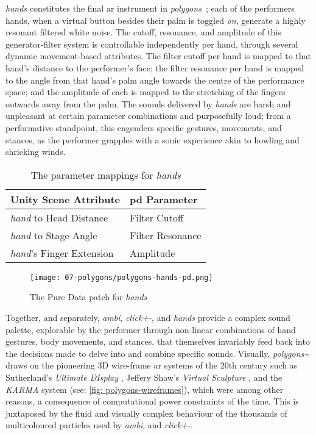 \textit{hands} constitutes the final \gls{ar} instrument in \textit{polygons~}; each of the performers hands, when a virtual button besides their palm is toggled \textit{on}, generate a highly resonant filtered white noise. The cutoff, resonance, and amplitude of this generator-filter system is controllable independently per hand, through several dynamic movement-based attributes. The filter cutoff per hand is mapped to that hand's distance to the performer's face; the filter resonance per hand is mapped to the angle from that hand's palm angle towards the centre of the performance space; and the amplitude of each is mapped to the stretching of the fingers outwards away from the palm. The sounds delivered by \textit{hands} are harsh and unpleasant at certain parameter combinations and purposefully loud; from a performative standpoint, this engenders specific gestures, movements, and stances, as the performer grapples with a sonic experience akin to howling and shrieking winds.
\begin{table}
    \centering
    \begin{tabular}{ l|l }
        \textbf{Unity Scene Attribute}         & \textbf{\gls{pd} Parameter}    \\
        \hline      
        \textit{hand} to Head Distance         & Filter Cutoff                  \\
        \textit{hand} to Stage Angle           & Filter Resonance               \\
        \textit{hand}'s Finger Extension       & Amplitude               
    \end{tabular}
    \caption{The parameter mappings for \textit{hands}}
    \label{fig: polygons-hands-mapping}
\end{table}
\begin{figure}
    \centering
    \texttt{[image: 07-polygons/polygons-hands-pd.png]}
    \caption{The Pure Data patch for \textit{hands}}
    \label{fig: polygons-hands-pd}
\end{figure}

Together, and separately, \textit{ambi}, \textit{click+-}, and \textit{hands} provide a complex sound palette, explorable by the performer through non-linear combinations of hand gestures, body movements, and stances, that themselves invariably feed back into the decisions made to delve into and combine specific sounds. Visually, \textit{polygons\textasciitilde{}} draws on the pioneering 3D wire-frame \gls{ar} systems of the 20th century such as Sutherland's \textit{Ultimate DIsplay} \citeyearpar{sutherland1968}, Jeffery Shaw's \textit{Virtual Sculpture} \citeyearpar{shaw1981}, and the \textit{KARMA} system \citep{feiner1993} (see: \autoref{fig: polygons-wireframes}), which were among other reasons, a consequence of computational power constraints of the time. This is juxtaposed by the fluid and visually complex behaviour of the thousands of multicoloured particles used by \textit{ambi}, and \textit{click+-}.

